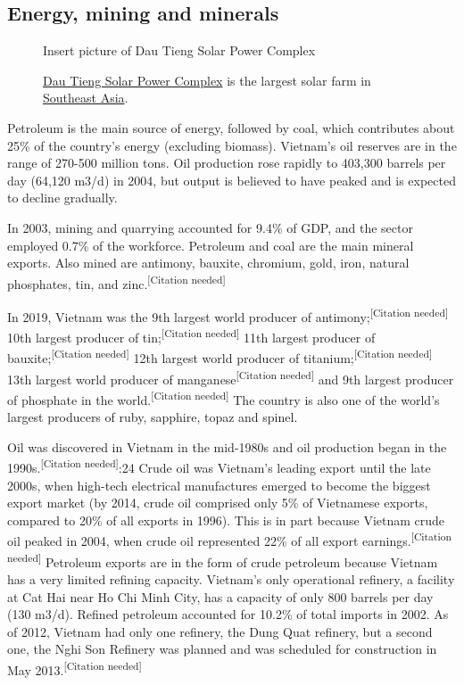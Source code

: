 \documentclass{article}
\begin{document}
\subsection*{Energy, mining and minerals}

\begin{figure}
    \begin{framed}
    Insert picture of Dau Tieng Solar Power Complex
    \caption*{\href{https://en.wikipedia.org/wiki/Dau_Tieng_Solar_Power_Project}{Dau Tieng Solar Power Complex} is the largest solar farm in \href{https://en.wikipedia.org/wiki/Southeast_Asia}{Southeast Asia}.}
    \end{framed}
\end{figure}

Petroleum is the main source of energy, followed by coal, which contributes about 25\% of the country's energy (excluding biomass). Vietnam's oil reserves are in the range of 270-500 million tons. Oil production rose rapidly to 403,300 barrels per day (64,120 m3/d) in 2004, but output is believed to have peaked and is expected to decline gradually.

In 2003, mining and quarrying accounted for 9.4\% of GDP, and the sector employed 0.7\% of the workforce. Petroleum and coal are the main mineral exports. Also mined are antimony, bauxite, chromium, gold, iron, natural phosphates, tin, and zinc.\textsuperscript{[Citation needed]}

In 2019, Vietnam was the 9th largest world producer of antimony;\textsuperscript{[Citation needed]} 10th largest producer of tin;\textsuperscript{[Citation needed]} 11th largest producer of \\bauxite;\textsuperscript{[Citation needed]} 12th largest world producer of titanium;\textsuperscript{[Citation needed]} 13th largest world producer of manganese\textsuperscript{[Citation needed]} and 9th largest producer of phosphate in the world.\textsuperscript{[Citation needed]} The country is also one of the world's largest producers of ruby, sapphire, topaz and spinel.

Oil was discovered in Vietnam in the mid-1980s and oil production began in the 1990s.\textsuperscript{[Citation needed]}:24 Crude oil was Vietnam's leading export until the late 2000s, when high-tech electrical manufactures emerged to become the biggest export market (by 2014, crude oil comprised only 5\% of Vietnamese exports, compared to 20\% of all exports in 1996). This is in part because Vietnam crude oil peaked in 2004, when crude oil represented 22\% of all export earnings.\textsuperscript{[Citation needed]} Petroleum exports are in the form of crude petroleum because Vietnam has a very limited refining capacity. Vietnam's only operational refinery, a facility at Cat Hai near Ho Chi Minh City, has a capacity of only 800 barrels per day (130 m3/d). Refined petroleum accounted for 10.2\% of total imports in 2002. As of 2012, Vietnam had only one refinery, the Dung Quat refinery, but a second one, the Nghi Son Refinery was planned and was scheduled for construction in May 2013.\textsuperscript{[Citation needed]}
\end{document}
